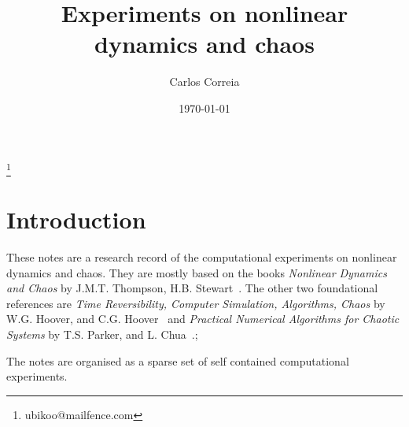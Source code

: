 \documentclass[11pt, a4paper, oneside]{article}
\providecommand{\keywords}[1]
{
  \small
  \textbf{\textit{Keywords --}} #1
}
\providecommand{\email}[1]
{
  \small
  \footnote{#1}
}
\begin{document}
%
%
\title{Experiments on nonlinear dynamics and chaos}
\date{\today}
\maketitle     			%

%
%
\begin{center}
\author{Carlos Correia}
\email{ubikoo@mailfence.com}
\end{center}

%
%
%



%
\section{Introduction}
\label{sec:intro}
These notes are a research record of the computational experiments on nonlinear dynamics and chaos.
They are mostly based on the books \textit{Nonlinear Dynamics and Chaos} by J.M.T. Thompson, H.B. Stewart~\citep{thompson2002nonlinear}.
The other two foundational references are
\textit{Time Reversibility, Computer Simulation, Algorithms, Chaos} by W.G. Hoover, and C.G. Hoover~\citep{hoover2012time} and \textit{Practical Numerical Algorithms for Chaotic Systems} by T.S. Parker, and L. Chua~\citep{parker2012practical}.;

The notes are organised as a sparse set of self contained computational experiments.


\end{document}
